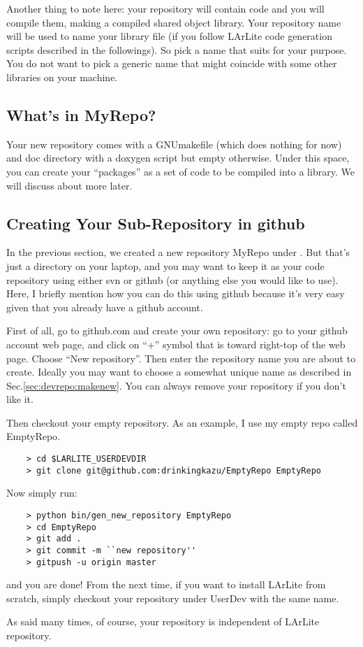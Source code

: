Another thing to note here: your repository will contain code and you will compile them, making a compiled shared object library. 
Your repository name will be used to name your library file (if you follow LArLite code generation scripts described in the followings). 
So pick a name that suits for your purpose. You do not want to pick a generic name that might coincide with some other libraries on your machine.

\subsection{What's in MyRepo?}

Your new repository comes with a GNUmakefile (which does nothing for now) and {\ttfamily doc} 
directory with a doxygen script but empty otherwise. Under this space, you can create your ``packages'' as a 
set of \CPP code to be compiled into a library. We will discuss about more later.

\subsection{Creating Your Sub-Repository in {\ttfamily github}}
In the previous section, we created a new repository {\ttfamily MyRepo} under \UserDev. But that's just a directory on your laptop, and you may want to keep it as your code repository using either {\ttfamily svn} or {\ttfamily github} (or anything else you would like to use). Here, I briefly mention how you can do this using {\ttfamily github} because it's very easy given that you already have a {\ttfamily github} account.

First of all, go to {\ttfamily github.com} and create your own repository: go to your {\ttfamily github} account web page, and click on ``+'' symbol that is toward right-top of the web page. Choose ``New repository''. Then enter the repository name you are about to create. Ideally you may want to choose a somewhat unique name as described in Sec.\ref{sec:devrepo:makenew}. You can always remove your repository if you don't like it.

Then checkout your empty repository. As an example, I use my empty repo called {\ttfamily EmptyRepo}.
\begin{lstlisting}
    > cd $LARLITE_USERDEVDIR
    > git clone git@github.com:drinkingkazu/EmptyRepo EmptyRepo
\end{lstlisting}
Now simply run:
\begin{lstlisting}
    > python bin/gen_new_repository EmptyRepo
    > cd EmptyRepo
    > git add .
    > git commit -m ``new repository''
    > gitpush -u origin master
\end{lstlisting}
and you are done!
From the next time, if you want to install LArLite from scratch, simply checkout your repository under UserDev with the same name.

As said many times, of course, your repository is independent of LArLite repository.



